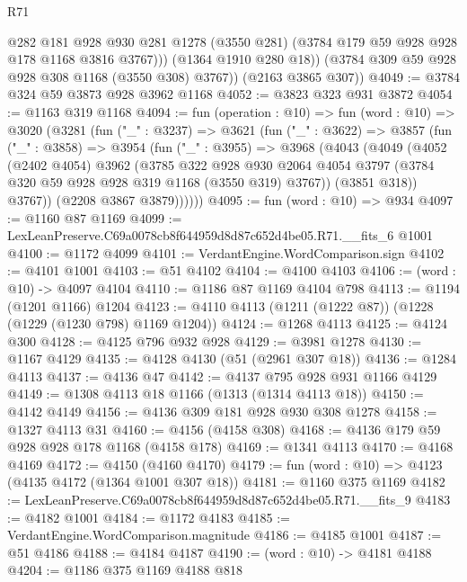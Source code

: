 \begin{lexlean}{R71}
\begin{coremodule}
              @282
              @181
              @928
              @930
              @281
              @1278
              (@3550 @281)
              (@3784 @179 @59 @928 @928 @178 @1168 @3816 @3767)))
          (@1364 @1910 @280 @18))
        (@3784 @309 @59 @928 @928 @308 @1168 (@3550 @308) @3767))
      (@2163 @3865 @307))
@4049 := @3784 @324 @59 @3873 @928 @3962 @1168
@4052 := @3823 @323 @931 @3872
@4054 := @1163 @319 @1168
@4094 := fun (operation : @10) =>
  fun (word : @10) =>
  @3020
    (@3281
      (fun ("_" : @3237) =>
      @3621
        (fun ("_" : @3622) =>
        @3857
          (fun ("_" : @3858) =>
          @3954
            (fun ("_" : @3955) =>
            @3968
              (@4043
                (@4049
                  (@4052
                    (@2402 @4054)
                    @3962
                    (@3785
                      @322
                      @928
                      @930
                      @2064
                      @4054
                      @3797
                      (@3784 @320 @59 @928 @928 @319 @1168 (@3550 @319) @3767))
                    (@3851 @318))
                  @3767))
              (@2208 @3867 @3879))))))
@4095 := fun (word : @10) => @934
@4097 := @1160 @87 @1169
@4099 := LexLeanPreserve.C69a0078cb8f644959d8d87c652d4be05.R71.__fits_6 @1001
@4100 := @1172 @4099
@4101 := VerdantEngine.WordComparison.sign
@4102 := @4101 @1001
@4103 := @51 @4102
@4104 := @4100 @4103
@4106 := (word : @10) -> @4097 @4104
@4110 := @1186 @87 @1169 @4104 @798
@4113 := @1194 (@1201 @1166) @1204
@4123 := @4110 @4113 (@1211 (@1222 @87)) (@1228 (@1229 (@1230 @798) @1169 @1204))
@4124 := @1268 @4113
@4125 := @4124 @300
@4128 := @4125 @796 @932 @928
@4129 := @3981 @1278
@4130 := @1167 @4129
@4135 := @4128 @4130 (@51 (@2961 @307 @18))
@4136 := @1284 @4113
@4137 := @4136 @47
@4142 := @4137 @795 @928 @931 @1166 @4129
@4149 := @1308 @4113 @18 @1166 (@1313 (@1314 @4113 @18))
@4150 := @4142 @4149
@4156 := @4136 @309 @181 @928 @930 @308 @1278
@4158 := @1327 @4113 @31
@4160 := @4156 (@4158 @308)
@4168 := @4136 @179 @59 @928 @928 @178 @1168 (@4158 @178)
@4169 := @1341 @4113
@4170 := @4168 @4169
@4172 := @4150 (@4160 @4170)
@4179 := fun (word : @10) => @4123 (@4135 @4172 (@1364 @1001 @307 @18))
@4181 := @1160 @375 @1169
@4182 := LexLeanPreserve.C69a0078cb8f644959d8d87c652d4be05.R71.__fits_9
@4183 := @4182 @1001
@4184 := @1172 @4183
@4185 := VerdantEngine.WordComparison.magnitude
@4186 := @4185 @1001
@4187 := @51 @4186
@4188 := @4184 @4187
@4190 := (word : @10) -> @4181 @4188
@4204 := @1186
    @375
    @1169
    @4188
    @818

\end{coremodule}
\end{lexlean}
